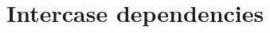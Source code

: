 \section{Intercase dependencies}  \label{s::intercase-dependencies}
	\begin{comment}
		List the identifiers of test cases that must be executed prior to this test case. Summarize the nature of
		the dependencies. If test cases are documented (in a tool or otherwise) in the order in which they need
		to be executed, the Intercase Dependencies for most or all of the cases may not be needed
	\end{comment}
	